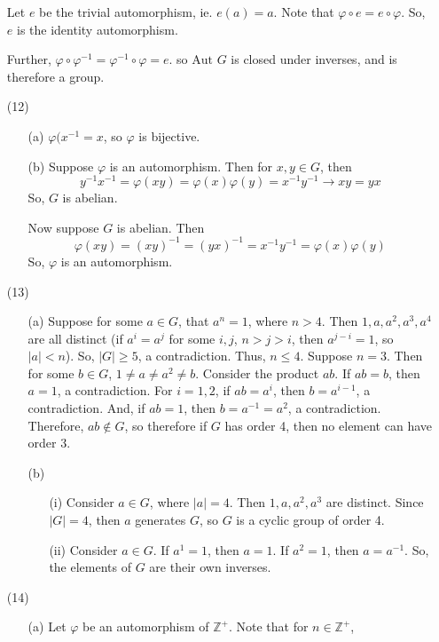 \begin{itemize}
Let $e$ be the trivial automorphism, ie. $e(a) = a$. Note that $\varphi \circ e = e \circ \varphi$. So, $e$ is the identity automorphism.

Further, $\varphi \circ \varphi^{-1} = \varphi^{-1} \circ \varphi = e$. so $\text{Aut }G$ is closed under inverses, and is therefore a group.
\item[(12)]
\begin{itemize}
\item[(a)]
$\varphi(x^{-1} = x$, so $\varphi$ is bijective.
\item[(b)]
Suppose $\varphi$ is an automorphism. Then for $x, y \in G$, then
$$y^{-1}x^{-1} = \varphi(xy) = \varphi(x)\varphi(y) = x^{-1}y^{-1} \rightarrow xy = yx$$
So, $G$ is abelian.

Now suppose $G$ is abelian. Then
$$\varphi(xy) = (xy)^{-1} = (yx)^{-1} = x^{-1}y^{-1} = \varphi(x)\varphi(y)$$
So, $\varphi$ is an automorphism.
\end{itemize}
\item[(13)]
\begin{itemize}
\item[(a)]
Suppose for some $a \in G$, that $a^n = 1$, where $n > 4$. Then $1, a, a^2, a^3, a^4$ are all distinct (if $a^i = a^j$ for some $i, j$, $n > j > i$, then $a^{j - i} = 1$, so $|a| < n$). So, $|G| \geq 5$, a contradiction. Thus, $n \leq 4$. Suppose $n = 3$. Then for some $b \in G$, $1 \neq a \neq a^2 \neq b$. Consider the product $ab$. If $ab = b$, then $a = 1$, a contradiction. For $i = 1,2$, if $ab = a^i$, then $b = a^{i - 1}$, a contradiction. And, if $ab = 1$, then $b = a^{-1} = a^2$, a contradiction. Therefore, $ab \not \in G$, so therefore if $G$ has order 4, then no element can have order 3.
\item[(b)]
\begin{itemize}
\item[(i)]
Consider $a \in G$, where $|a| = 4$. Then $1, a, a^2, a^3$ are distinct. Since $|G| = 4$, then $a$ generates $G$, so $G$ is a cyclic group of order 4.
\item[(ii)]
Consider $a \in G$. If $a^1 = 1$, then $a = 1$. If $a^2 = 1$, then $a = a^{-1}$. So, the elements of $G$ are their own inverses.
\end{itemize}
\end{itemize}
\item[(14)]
\begin{itemize}
\item[(a)]
Let $\varphi$ be an automorphism of $\mathbb{Z}^+$. Note that for $n \in \mathbb{Z}^+$,

\end{itemize}
\end{itemize}
